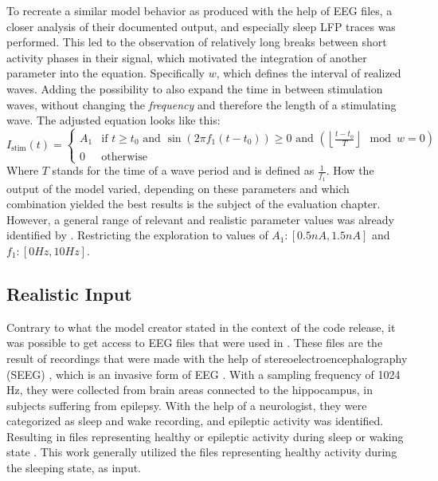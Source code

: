     To recreate a similar model behavior as \textcite{Aussel.2018} produced with the help of EEG files, a closer analysis of their documented output, and especially sleep LFP traces was performed. This led to the observation of relatively long breaks between short activity phases in their signal, which motivated the integration of another parameter into the equation. Specifically \(w\), which defines the interval of realized waves. Adding the possibility to also expand the time in between stimulation waves, without changing the \textit{frequency} and therefore the length of a stimulating wave. The adjusted equation looks like this: 
    \[I_{\text{stim}}(t) = 
    \begin{cases} 
    A_1 & \text{if } t \geq t_0 \text{ and } \sin(2\pi f_1 (t - t_0)) \geq 0 \text{ and } \left( \left\lfloor \frac{t - t_0}{T} \right\rfloor \mod w = 0 \right) \\ 
    0 & \text{otherwise} 
    \end{cases}\]
    Where \(T\) stands for the time of a wave period and is defined as \(\frac{1}{f_1}\). How the output of the model varied, depending on these parameters and which combination yielded the best results is the subject of the evaluation chapter. However, a general range of relevant and realistic parameter values was already identified by \textcite{Aussel.2021}. Restricting the exploration to values of \(A_1 : [0.5nA, 1.5nA]\) and \(f_1 : [0Hz, 10Hz]\).

    
    \subsection{Realistic Input}
    Contrary to what the model creator stated in the context of the code release, it was possible to get access to EEG files that were used in \cite{Aussel.2022}. These files are the result of recordings that were made with the help of stereoelectroencephalography (SEEG) \cite{Aussel.2018}, which is an invasive form of EEG \cite{Minotti.2018}. With a sampling frequency of 1024 Hz, they were collected from brain areas connected to the hippocampus, in subjects suffering from epilepsy. With the help of a neurologist, they were categorized as sleep and wake recording, and epileptic activity was identified. Resulting in files representing healthy or epileptic activity during sleep or waking state \cite{Aussel.2018}. This work generally utilized the files representing healthy activity during the sleeping state, as input.

